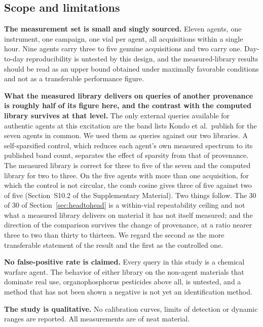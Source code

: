 \documentclass[review,12pt]{elsarticle}
\begin{document}
\subsection{Scope and limitations}

\textbf{The measurement set is small and singly sourced.} Eleven agents, one instrument,
one campaign, one vial per agent, all acquisitions within a single hour. Nine agents
carry three to five genuine acquisitions and two carry one. Day-to-day reproducibility
is untested by this design, and the measured-library results should be read as an upper
bound obtained under maximally favorable conditions and not as a transferable
performance figure.

\textbf{What the measured library delivers on queries of another provenance is roughly
half of its figure here, and the contrast with the computed library survives at that
level.} The only external queries available for authentic agents at this excitation are
the band lists Kondo et al.\ publish for the seven agents in common. We used them as
queries against our two libraries. A self-sparsified control, which reduces each agent's
own measured spectrum to its published band count, separates the effect of sparsity from
that of provenance. The measured library is correct for three to five of the seven and the
computed library for two to three. On the five agents with more than one acquisition, for
which the control is not circular, the comb cosine gives three of five against two of five
(Section~S10.2 of the Supplementary Material). Two things follow. The 30 of 30 of
Section~\ref{sec:headtohead} is a within-vial repeatability ceiling and not what a
measured library delivers on material it has not itself measured; and the direction of the
comparison survives the change of provenance, at a ratio nearer three to two than
thirty to thirteen. We regard the second as the more transferable statement of the
result and the first as the controlled one.

\textbf{No false-positive rate is claimed.} Every query in this study is a chemical
warfare agent. The behavior of either library on the non-agent materials that dominate
real use, organophosphorus pesticides above all, is untested, and a method that has
not been shown a negative is not yet an identification method.

\textbf{The study is qualitative.} No calibration curves, limits of detection or dynamic
ranges are reported.\cite{witkiewicz2018analysis} All measurements are of neat material.
\end{document}
